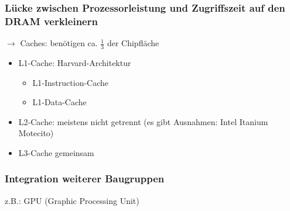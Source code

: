 \subsubsection{Lücke zwischen Prozessorleistung und Zugriffszeit auf den DRAM verkleinern}
\(\to\) Caches: benötigen ca. \(\frac{1}{3}\) der Chipfläche
\begin{itemize}
	\item L1-Cache: Harvard-Architektur
	\begin{itemize}
		\item L1-Instruction-Cache
		\item L1-Data-Cache
	\end{itemize}
	\item L2-Cache: meistens nicht getrennt (es gibt Ausnahmen: Intel Itanium Motecito)
	\item L3-Cache gemeinsam
\end{itemize}
\subsubsection{Integration weiterer Baugruppen}
z.B.: GPU (Graphic Processing Unit)

